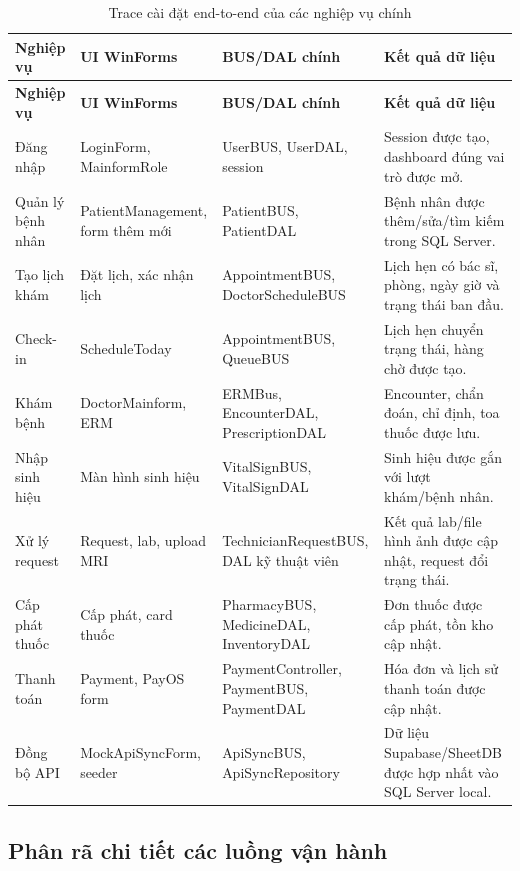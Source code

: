 \documentclass[12pt,a4paper]{article}
\numberwithin{figure}{subsection}
\numberwithin{table}{subsection}
\begin{document}
\begin{longtable}{|p{2.8cm}|p{3.8cm}|p{4.5cm}|p{4cm}|}
\caption{Trace cài đặt end-to-end của các nghiệp vụ chính} \\
\hline
\textbf{Nghiệp vụ} & \textbf{UI WinForms} & \textbf{BUS/DAL chính} & \textbf{Kết quả dữ liệu} \\
\hline
\endfirsthead
\hline
\textbf{Nghiệp vụ} & \textbf{UI WinForms} & \textbf{BUS/DAL chính} & \textbf{Kết quả dữ liệu} \\
\hline
\endhead
Đăng nhập & LoginForm, MainformRole & UserBUS, UserDAL, session & Session được tạo, dashboard đúng vai trò được mở. \\
\hline
Quản lý bệnh nhân & PatientManagement, form thêm mới & PatientBUS, PatientDAL & Bệnh nhân được thêm/sửa/tìm kiếm trong SQL Server. \\
\hline
Tạo lịch khám & Đặt lịch, xác nhận lịch & AppointmentBUS, DoctorScheduleBUS & Lịch hẹn có bác sĩ, phòng, ngày giờ và trạng thái ban đầu. \\
\hline
Check-in & ScheduleToday & AppointmentBUS, QueueBUS & Lịch hẹn chuyển trạng thái, hàng chờ được tạo. \\
\hline
Khám bệnh & DoctorMainform, ERM & ERMBus, EncounterDAL, PrescriptionDAL & Encounter, chẩn đoán, chỉ định, toa thuốc được lưu. \\
\hline
Nhập sinh hiệu & Màn hình sinh hiệu & VitalSignBUS, VitalSignDAL & Sinh hiệu được gắn với lượt khám/bệnh nhân. \\
\hline
Xử lý request & Request, lab, upload MRI & TechnicianRequestBUS, DAL kỹ thuật viên & Kết quả lab/file hình ảnh được cập nhật, request đổi trạng thái. \\
\hline
Cấp phát thuốc & Cấp phát, card thuốc & PharmacyBUS, MedicineDAL, InventoryDAL & Đơn thuốc được cấp phát, tồn kho cập nhật. \\
\hline
Thanh toán & Payment, PayOS form & PaymentController, PaymentBUS, PaymentDAL & Hóa đơn và lịch sử thanh toán được cập nhật. \\
\hline
Đồng bộ API & MockApiSyncForm, seeder & ApiSyncBUS, ApiSyncRepository & Dữ liệu Supabase/SheetDB được hợp nhất vào SQL Server local. \\
\hline
\end{longtable}

\subsection{Phân rã chi tiết các luồng vận hành}
\end{document}
